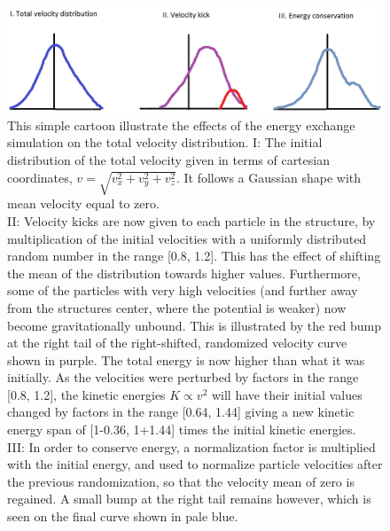 \begin{figure}[!htbp]
\centering
\includegraphics[width=15.0 cm]{img/Energy_exchange.png}
\caption{This simple cartoon illustrate the effects of the energy exchange simulation on the total velocity distribution. I: The initial distribution of the total velocity given in terms of cartesian coordinates,
$v=\sqrt{v_x^2+v_y^2+v_z^2}$. It follows a Gaussian shape with mean velocity equal to zero. \\
II: Velocity kicks are now given to each particle in the structure, by multiplication of the initial velocities with a uniformly distributed random number in the range [0.8, 1.2]. This has the effect of shifting the mean of the distribution towards higher values. Furthermore, some of the particles with very high velocities (and further away from the structures center, where the potential is weaker) now become gravitationally unbound. This is illustrated by the red bump at the right tail of the right-shifted, randomized velocity curve shown in purple. The total energy is now higher than what it was initially. As the velocities were perturbed by factors in the range [0.8, 1.2], the kinetic energies $K \propto v^2$ will have their initial values changed by factors in the range [0.64, 1.44] giving a new kinetic energy span of [1-0.36, 1+1.44] times the initial kinetic energies.\\
III: In order to conserve energy, a normalization factor is multiplied with the initial energy, and used to normalize particle velocities after the previous randomization, so that the velocity mean of zero is regained. A small bump at the right tail remains however, which is seen on the final curve shown in pale blue.}
\label{fig:test}
\end{figure}

